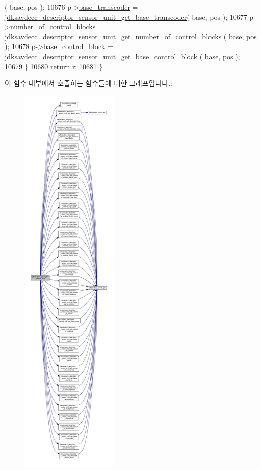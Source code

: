 \begin{DoxyCode}
      ( base, pos );
10676         p->\hyperlink{structjdksavdecc__descriptor__sensor__unit_ac7e02a98f43dc72d6384a6635fbaf944}{base\_transcoder} = 
      \hyperlink{group__descriptor__sensor_ga0453b7a4171ca82f60c1c98015baa634}{jdksavdecc\_descriptor\_sensor\_unit\_get\_base\_transcoder}(
       base, pos );
10677         p->\hyperlink{structjdksavdecc__descriptor__sensor__unit_a564f961a8cec6e8f7b4bfdbbbfe650d4}{number\_of\_control\_blocks} = 
      \hyperlink{group__descriptor__sensor_ga95f619830af7cfb75fd5cb65ed4fb26c}{jdksavdecc\_descriptor\_sensor\_unit\_get\_number\_of\_control\_blocks}
      ( base, pos );
10678         p->\hyperlink{structjdksavdecc__descriptor__sensor__unit_a9303491ec92ba42c28fb904c14d310b0}{base\_control\_block} = 
      \hyperlink{group__descriptor__sensor_ga27d66aa606dcaee923ef9400ec6f3221}{jdksavdecc\_descriptor\_sensor\_unit\_get\_base\_control\_block}
      ( base, pos );
10679     \}
10680     \textcolor{keywordflow}{return} r;
10681 \}
\end{DoxyCode}


이 함수 내부에서 호출하는 함수들에 대한 그래프입니다.\+:
\nopagebreak
\begin{figure}[H]
\begin{center}
\leavevmode
\includegraphics[height=550pt]{group__descriptor__sensor_gaaf9a5dff5959893f12a687e4873d19ef_cgraph}
\end{center}
\end{figure}


